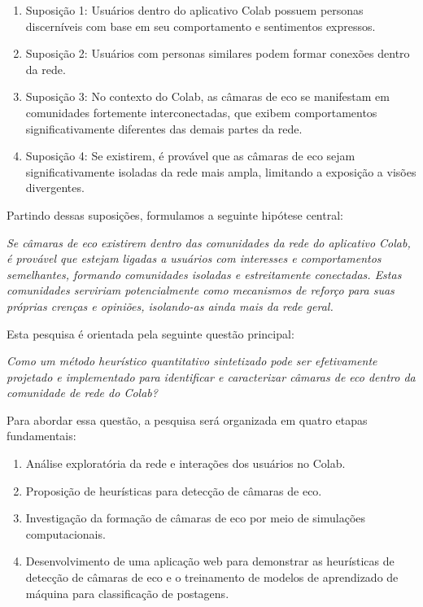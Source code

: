 \begin{enumerate}
	\item Suposição 1: Usuários dentro do aplicativo Colab possuem personas discerníveis com base em seu comportamento e sentimentos expressos.
	\item Suposição 2: Usuários com personas similares podem formar conexões dentro da rede.
	\item Suposição 3: No contexto do Colab, as câmaras de eco se manifestam em comunidades fortemente interconectadas, que exibem comportamentos significativamente diferentes das demais partes da rede.
	\item Suposição 4: Se existirem, é provável que as câmaras de eco sejam significativamente isoladas da rede mais ampla, limitando a exposição a visões divergentes.
\end{enumerate}

Partindo dessas suposições, formulamos a seguinte hipótese central:

\textit{
	Se câmaras de eco existirem dentro das comunidades da rede do aplicativo Colab, é provável que estejam ligadas a usuários com interesses e comportamentos semelhantes, formando comunidades isoladas e estreitamente conectadas. Estas comunidades serviriam potencialmente como mecanismos de reforço para suas próprias crenças e opiniões, isolando-as ainda mais da rede geral.
}

Esta pesquisa é orientada pela seguinte questão principal:

\textit{
	Como um método heurístico quantitativo sintetizado pode ser efetivamente projetado e implementado para identificar e caracterizar câmaras de eco dentro da comunidade de rede do Colab?
}

Para abordar essa questão, a pesquisa será organizada em quatro etapas fundamentais:

\begin{enumerate}
	\item Análise exploratória da rede e interações dos usuários no Colab.
	\item Proposição de heurísticas para detecção de câmaras de eco.
	\item Investigação da formação de câmaras de eco por meio de simulações computacionais.
	\item Desenvolvimento de uma aplicação web para demonstrar as heurísticas de detecção de câmaras de eco e o treinamento de modelos de aprendizado de máquina para classificação de postagens.
\end{enumerate}

